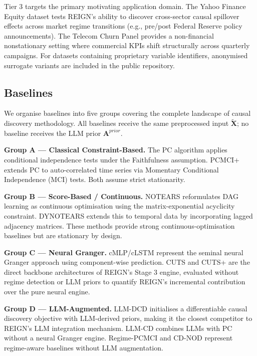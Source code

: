 Tier 3 targets the primary motivating application domain. The Yahoo Finance Equity dataset tests REIGN's ability to discover cross-sector causal spillover effects across market regime transitions (e.g., pre/post Federal Reserve policy announcements). The Telecom Churn Panel provides a non-financial nonstationary setting where commercial KPIs shift structurally across quarterly campaigns. For datasets containing proprietary variable identifiers, anonymised surrogate variants are included in the public repository.

\subsection{Baselines}

We organise baselines into five groups covering the complete landscape of causal discovery methodology. All baselines receive the same preprocessed input $\tilde{\mathbf{X}}$; no baseline receives the LLM prior $\mathbf{A}^{prior}$.

\textbf{Group A — Classical Constraint-Based.} The PC algorithm \cite{Spirtes2000} applies conditional independence tests under the Faithfulness assumption. PCMCI+ \cite{Runge2020} extends PC to auto-correlated time series via Momentary Conditional Independence (MCI) tests. Both assume strict stationarity.

\textbf{Group B — Score-Based / Continuous.} NOTEARS \cite{Zheng2018} reformulates DAG learning as continuous optimisation using the matrix-exponential acyclicity constraint. DYNOTEARS \cite{pamfil2020dynotears} extends this to temporal data by incorporating lagged adjacency matrices. These methods provide strong continuous-optimisation baselines but are stationary by design.

\textbf{Group C — Neural Granger.} cMLP/cLSTM \cite{Tank2022} represent the seminal neural Granger approach using component-wise prediction. CUTS \cite{Cheng2023} and CUTS+ \cite{Cheng2024} are the direct backbone architectures of REIGN's Stage 3 engine, evaluated without regime detection or LLM priors to quantify REIGN's incremental contribution over the pure neural engine.

\textbf{Group D — LLM-Augmented.} LLM-DCD \cite{Waxman2024} initialises a differentiable causal discovery objective with LLM-derived priors, making it the closest competitor to REIGN's LLM integration mechanism. LLM-CD \cite{Du2025} combines LLMs with PC without a neural Granger engine. Regime-PCMCI \cite{saggioro2020causal} and CD-NOD \cite{huang2020causal} represent regime-aware baselines without LLM augmentation.

